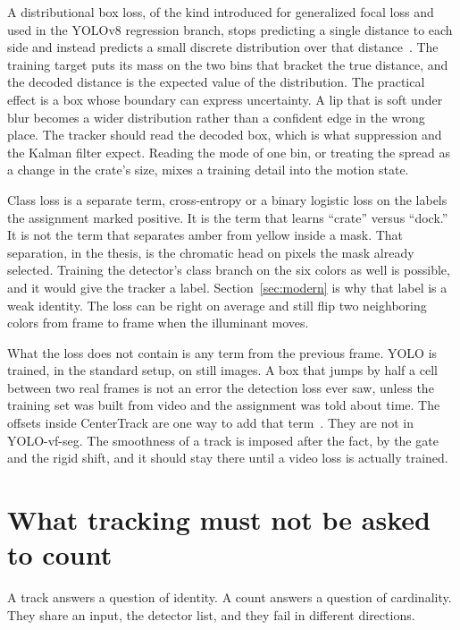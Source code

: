 \documentclass[11pt,a4paper]{article}
\begin{document}
A distributional box loss, of the kind introduced for generalized focal loss and used in the YOLOv8 regression branch, stops predicting a single distance to each side and instead predicts a small discrete distribution over that distance~\cite{li2020gfl}. The training target puts its mass on the two bins that bracket the true distance, and the decoded distance is the expected value of the distribution. The practical effect is a box whose boundary can express uncertainty. A lip that is soft under blur becomes a wider distribution rather than a confident edge in the wrong place. The tracker should read the decoded box, which is what suppression and the Kalman filter expect. Reading the mode of one bin, or treating the spread as a change in the crate's size, mixes a training detail into the motion state.

Class loss is a separate term, cross-entropy or a binary logistic loss on the labels the assignment marked positive. It is the term that learns ``crate'' versus ``dock.'' It is not the term that separates amber from yellow inside a mask. That separation, in the thesis, is the chromatic head on pixels the mask already selected. Training the detector's class branch on the six colors as well is possible, and it would give the tracker a label. Section~\ref{sec:modern} is why that label is a weak identity. The loss can be right on average and still flip two neighboring colors from frame to frame when the illuminant moves.

What the loss does not contain is any term from the previous frame. YOLO is trained, in the standard setup, on still images. A box that jumps by half a cell between two real frames is not an error the detection loss ever saw, unless the training set was built from video and the assignment was told about time. The offsets inside CenterTrack are one way to add that term~\cite{zhou2020centertrack}. They are not in YOLO-vf-seg. The smoothness of a track is imposed after the fact, by the gate and the rigid shift, and it should stay there until a video loss is actually trained.

\section{What tracking must not be asked to count}
\label{sec:count}

A track answers a question of identity. A count answers a question of cardinality. They share an input, the detector list, and they fail in different directions.
\end{document}
